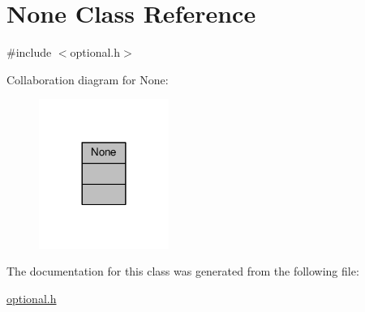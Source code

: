 \hypertarget{classNone}{}\section{None Class Reference}
\label{classNone}


{\ttfamily \#include $<$optional.\+h$>$}



Collaboration diagram for None\+:
\nopagebreak
\begin{figure}[H]
\begin{center}
\leavevmode
\includegraphics[width=120pt]{classNone__coll__graph}
\end{center}
\end{figure}


The documentation for this class was generated from the following file\+:\begin{DoxyCompactItemize}
\item 
\hyperlink{optional_8h}{optional.\+h}\end{DoxyCompactItemize}
